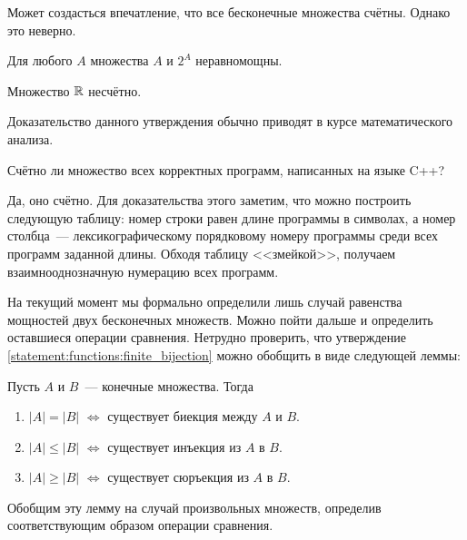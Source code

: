 Может создасться впечатление, что все бесконечные множества счётны.
Однако это неверно.

\begin{theorem}[Кантора]
    Для любого $ A $ множества $ A $ и $ 2^A $ неравномощны.
\end{theorem}

\begin{statement}
    Множество $ \mathbb{R} $ несчётно.
\end{statement}

Доказательство данного утверждения обычно приводят в курсе математического анализа.

\begin{Exercise}[counter=SecExercise]
    \noindent
    Счётно ли множество всех корректных программ, написанных на языке C++?
\end{Exercise}

\begin{Answer}
    \noindent
    Да, оно счётно.
    Для доказательства этого заметим, что можно построить следующую таблицу:
    номер строки равен длине программы в символах, а номер столбца~--- лексикографическому порядковому номеру программы среди всех программ заданной длины.
    Обходя таблицу <<змейкой>>, получаем взаимнооднозначную нумерацию всех программ.
\end{Answer}

На текущий момент мы формально определили лишь случай равенства мощностей двух бесконечных множеств.
Можно пойти дальше и определить оставшиеся операции сравнения.
Нетрудно проверить, что утверждение \ref{statement:functions:finite_bijection} можно обобщить в виде следующей леммы:

\begin{lemma}
    \label{lemma:functions:finite_cardinality_compare}
    Пусть $ A $ и $ B $~--- конечные множества.
    Тогда
    \begin{enumerate}
        \item $ |A| = |B| $ $ \Longleftrightarrow $ существует биекция между $ A $ и $ B $.
        \item $ |A| \leqslant |B| $ $ \Longleftrightarrow $ существует инъекция из $ A $ в $ B $.
        \item $ |A| \geqslant |B| $ $ \Longleftrightarrow $ существует сюръекция из $ A $ в $ B $.
    \end{enumerate}
\end{lemma}

Обобщим эту лемму на случай произвольных множеств, определив соответствующим образом операции сравнения.

